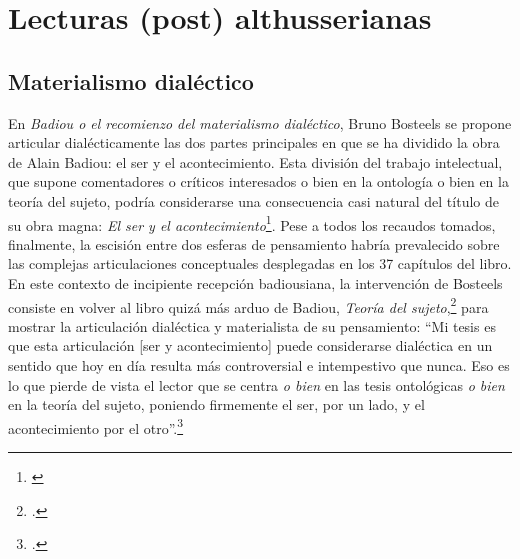 \section{Lecturas (post) althusserianas} %

\subsection{Materialismo dialéctico} %

En \emph{Badiou o el recomienzo del materialismo dialéctico}, Bruno Bosteels se propone articular dialécticamente las dos partes principales en que se ha dividido la obra de Alain Badiou: el ser y el acontecimiento. Esta división del trabajo intelectual, que supone comentadores o críticos interesados o bien en la ontología o bien en la teoría del sujeto, podría considerarse una consecuencia casi natural del título de su obra magna: \emph{El ser y el acontecimiento}\footnote{\cite[][]{@7143-BADIOU1999}}. Pese a todos los recaudos tomados, finalmente, la escisión entre dos esferas de pensamiento habría prevalecido sobre las complejas articulaciones conceptuales desplegadas en los 37 capítulos del libro. En este contexto de incipiente recepción badiousiana, la intervención de Bosteels consiste en volver al libro quizá más arduo de Badiou, \emph{Teoría del sujeto},\footcite[][]{@7144-BADIOU2009} para mostrar la articulación dialéctica y materialista de su pensamiento: \enquote{Mi tesis es que esta articulación {[}ser y acontecimiento{]} puede considerarse dialéctica en un sentido que hoy en día resulta más controversial e intempestivo que nunca. Eso es lo que pierde de vista el lector que se centra \emph{o bien} en las tesis ontológicas \emph{o bien} en la teoría del sujeto, poniendo firmemente el ser, por un lado, y el acontecimiento por el otro}.\footcite[][10]{@7022-BOSTEELS2007}

